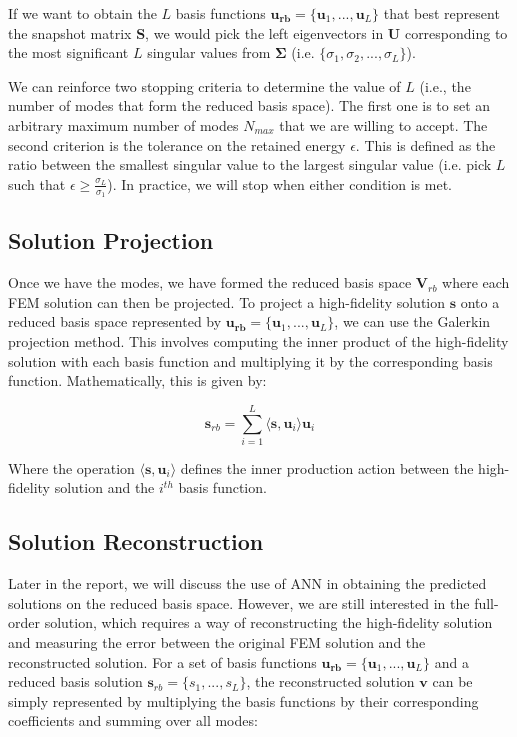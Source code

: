 If we want to obtain the $L$ basis functions $\mathbf{u_{rb}} = \{\mathbf{u}_1,...,\mathbf{u}_L\}$ that best represent the snapshot matrix $\mathbf{S}$, we would pick the left eigenvectors in $\mathbf{U}$ corresponding to the most significant $L$ singular values from $\mathbf{\Sigma}$ (i.e. $\{\sigma_1, \sigma_2,...,\sigma_{L}\}$). 

We can reinforce two stopping criteria to determine the value of $L$ (i.e., the number of modes that form the reduced basis space). The first one is to set an arbitrary maximum number of modes $N_{max}$ that we are willing to accept. The second criterion is the tolerance on the retained energy $\epsilon$. This is defined as the ratio between the smallest singular value to the largest singular value (i.e. pick $L$ such that $\epsilon \geq \frac{\sigma_{L}}{\sigma_1}$). In practice, we will stop when either condition is met.

\subsection{Solution Projection}
Once we have the modes, we have formed the reduced basis space $\mathbf{V}_{rb}$ where each FEM solution can then be projected. To project a high-fidelity solution $\mathbf{s}$ onto a reduced basis space represented by $\mathbf{u_{rb}} = \{\mathbf{u}_1,...,\mathbf{u}_L\}$, we can use the Galerkin projection method. This involves computing the inner product of the high-fidelity solution with each basis function and multiplying it by the corresponding basis function. Mathematically, this is given by: 

\begin{equation*}
    \mathbf{s}_{rb} = \sum_{i=1}^{L} \langle \mathbf{s}, \mathbf{u}_i \rangle  \mathbf{u}_i
\end{equation*}

Where the operation $\langle \mathbf{s}, \mathbf{u}_i \rangle$ defines the inner production action between the high-fidelity solution and the $i^{th}$ basis function.  

\subsection{Solution Reconstruction}

Later in the report, we will discuss the use of ANN in obtaining the predicted solutions on the reduced basis space. However, we are still interested in the full-order solution, which requires a way of reconstructing the high-fidelity solution and measuring the error between the original FEM solution and the reconstructed solution. For a set of basis functions $\mathbf{u_{rb}} = \{\mathbf{u}_1,...,\mathbf{u}_L\}$ and a reduced basis solution $\mathbf{s}_{rb} = \{s_1,...,s_L\}$, the reconstructed solution $\mathbf{v}$ can be simply represented by multiplying the basis functions by their corresponding coefficients and summing over all modes:

